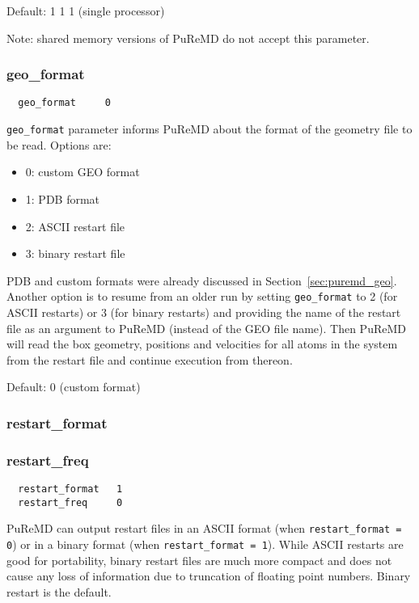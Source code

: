 \documentclass{article}
\begin{document}
Default: 1 1 1 (single processor)

Note: shared memory versions of PuReMD do not accept this parameter.

\subsubsection{geo\_format}
\label{sec:geo_format}

\begin{verbatim}
  geo_format     0
\end{verbatim}
{\tt geo\_format} parameter informs PuReMD about the format of the 
geometry file to be read. Options are:
\begin{itemize}
  \item 0: custom GEO format
  \item 1: PDB format
  \item 2: ASCII restart file
  \item 3: binary restart file
\end{itemize}
PDB and custom formats were already discussed in Section~\ref{sec:puremd_geo}.
Another option is to resume from an older run by setting {\tt geo\_format}
to 2 (for ASCII restarts) or 3 (for binary restarts) and providing the name 
of the restart file as an argument to PuReMD (instead of the GEO file name).
Then PuReMD will read the box geometry, positions and velocities for all 
atoms in the system from the restart file and continue execution from thereon. 

Default: 0 (custom format)

\subsubsection{restart\_format}
\label{sec:restart_format}
\subsubsection{restart\_freq}
\label{sec:restart_freq}

\begin{verbatim}
  restart_format   1
  restart_freq     0
\end{verbatim}
PuReMD can output restart files in an ASCII format (when 
{\tt restart\_format = 0}) or in a binary format (when {\tt restart\_format = 1}).
While ASCII restarts are good for portability, binary restart files are 
much more compact and does not cause any loss of information due to 
truncation of floating point numbers. Binary restart is the default.
\end{document}
